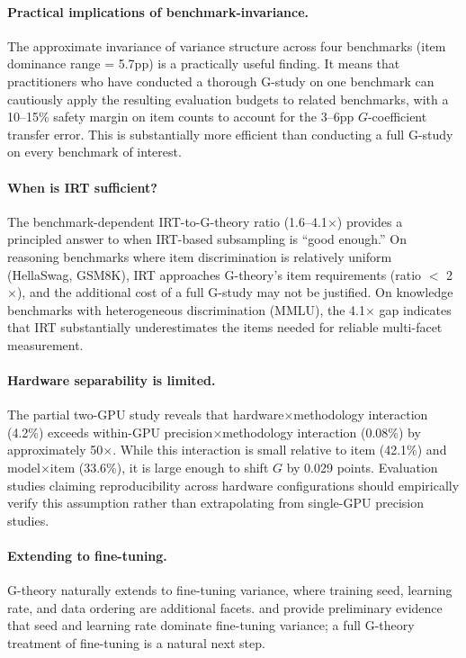 \documentclass[letterpaper]{article}
\begin{document}
\paragraph{Practical implications of benchmark-invariance.}
The approximate invariance of variance structure across four benchmarks (item dominance range = 5.7pp) is a practically useful finding.
It means that practitioners who have conducted a thorough G-study on one benchmark can cautiously apply the resulting evaluation budgets to related benchmarks, with a 10--15\% safety margin on item counts to account for the 3--6pp $G$-coefficient transfer error.
This is substantially more efficient than conducting a full G-study on every benchmark of interest.

\paragraph{When is IRT sufficient?}
The benchmark-dependent IRT-to-G-theory ratio (1.6--4.1$\times$) provides a principled answer to when IRT-based subsampling is ``good enough.''
On reasoning benchmarks where item discrimination is relatively uniform (HellaSwag, GSM8K), IRT approaches G-theory's item requirements (ratio $<$ 2$\times$), and the additional cost of a full G-study may not be justified.
On knowledge benchmarks with heterogeneous discrimination (MMLU), the 4.1$\times$ gap indicates that IRT substantially underestimates the items needed for reliable multi-facet measurement.

\paragraph{Hardware separability is limited.}
The partial two-GPU study reveals that hardware$\times$methodology interaction (4.2\%) exceeds within-GPU precision$\times$methodology interaction (0.08\%) by approximately 50$\times$.
While this interaction is small relative to item (42.1\%) and model$\times$item (33.6\%), it is large enough to shift $G$ by 0.029 points.
Evaluation studies claiming reproducibility across hardware configurations should empirically verify this assumption rather than extrapolating from single-GPU precision studies.

\paragraph{Extending to fine-tuning.}
G-theory naturally extends to fine-tuning variance, where training seed, learning rate, and data ordering are additional facets.
\citet{dodge2020finetuning} and \citet{bui2025seed} provide preliminary evidence that seed and learning rate dominate fine-tuning variance; a full G-theory treatment of fine-tuning is a natural next step.
\end{document}
